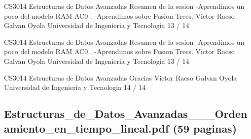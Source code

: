 \begin{description}[leftmargin=!,labelwidth=4.2em,style=nextline]
\item[Pag. 50] CS3014 Estructuras de Datos Avanzadas Resumen de la sesion -Aprendimos un poco del modelo RAM AC0 . -Aprendimos sobre Fusion Trees. Victor Racso Galvan Oyola Universidad de Ingenieria y Tecnologia 13 / 14
\item[Pag. 51] CS3014 Estructuras de Datos Avanzadas Resumen de la sesion -Aprendimos un poco del modelo RAM AC0 . -Aprendimos sobre Fusion Trees. Victor Racso Galvan Oyola Universidad de Ingenieria y Tecnologia 13 / 14
\item[Pag. 52] CS3014 Estructuras de Datos Avanzadas Gracias Victor Racso Galvan Oyola Universidad de Ingenieria y Tecnologia 14 / 14
\end{description}
\subsection*{Estructuras\_de\_Datos\_Avanzadas\_\_\_Ordenamiento\_en\_tiempo\_lineal.pdf (59 paginas)}
